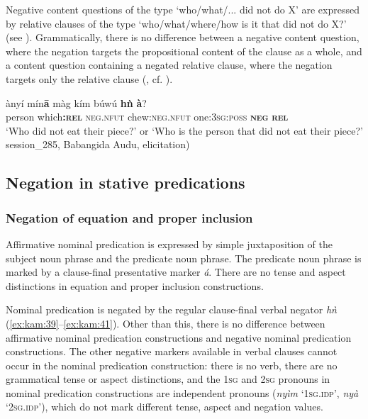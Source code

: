 \documentclass[output=paper,colorlinks,citecolor=brown]{langscibook}
\begin{document}
Negative content questions of the type ‘who/what/... did not do X’ are expressed by relative clauses of the type ‘who/what/where/how is it that did not do X?’ (see ). Grammatically, there is no difference between a negative content question, where the negation targets the propositional content of the clause as a whole, and a content question containing a negated relative clause, where the negation targets only the relative clause (, cf. ).

\ea\label{ex:kam:38} 
    \gll ànyí mín\textbf{ā} màg kím búwú \textbf{hǹ} \textbf{à}?\\
        person which\textbf{:\textsc{rel}} \textsc{neg.nfut} chew:\textsc{neg.nfut} one:\textsc{3sg:poss} \textbf{\textsc{neg}} \textbf{\textsc{rel}}\\
    \glt ‘Who did not eat their piece?’ or ‘Who is the person that did not eat their piece?’ session\_285, Babangida Audu, elicitation)
\z 

\subsection{Negation in stative predications}\label{sec:kam:2.3}

\subsubsection{Negation of equation and proper inclusion}\label{sec:kam:2.3.1}

Affirmative nominal predication is expressed by simple juxtaposition of the subject noun phrase and the predicate noun phrase. The predicate noun phrase is marked by a clause-final presentative marker \textit{á}. There are no tense and aspect distinctions in equation and proper inclusion constructions.

Nominal predication is negated by the regular clause-final verbal negator \textit{hǹ} (\ref{ex:kam:39}--\ref{ex:kam:41}). Other than this, there is no difference between affirmative nominal predication constructions and negative nominal predication constructions. The other negative markers available in verbal clauses cannot occur in the nominal predication construction: there is no verb, there are no grammatical tense or aspect distinctions, and the 1\textsc{sg} and 2\textsc{sg} pronouns in nominal predication constructions are independent pronouns (\textit{nyìm} ‘1\textsc{sg.idp}’, \textit{nyà} ‘2\textsc{sg.idp}’), which do not mark different tense, aspect and negation values.
\end{document}

